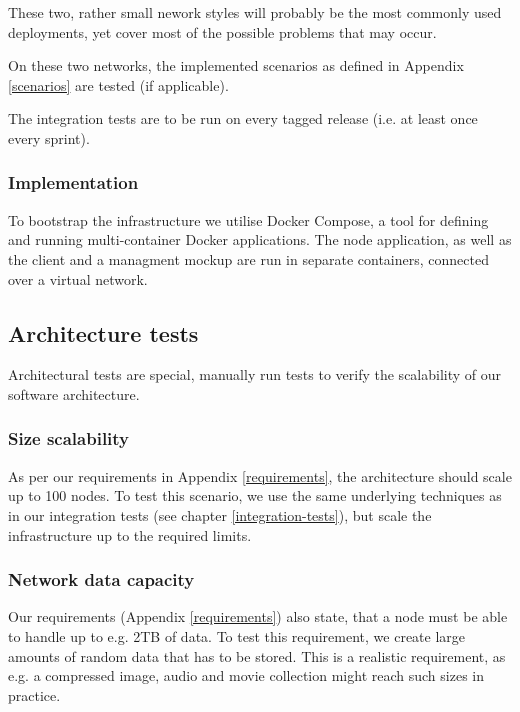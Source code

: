 These two, rather small nework styles will probably be the most commonly used deployments, yet cover most of the possible problems that may occur.

On these two networks, the implemented scenarios as defined in Appendix \ref{scenarios} are tested (if applicable).

The integration tests are to be run on every tagged release (i.e. at least once every sprint).

\subsubsection{Implementation}

To bootstrap the infrastructure we utilise Docker Compose, a tool for defining and running multi-container Docker applications\cite{docker-compose}. The node application, as well as the client and a managment mockup are run in separate containers, connected over a virtual network.

\subsection{Architecture tests}

Architectural tests are special, manually run tests to verify the scalability of our software architecture.

\subsubsection{Size scalability}
As per our requirements in Appendix \ref{requirements}, the architecture should scale up to 100 nodes. To test this scenario, we use the same underlying techniques as in our integration tests (see chapter \ref{integration-tests}), but scale the infrastructure up to the required limits.

\subsubsection{Network data capacity}
Our requirements (Appendix \ref{requirements}) also state, that a node must be able to handle up to e.g. 2TB of data. To test this requirement, we create large amounts of random data that has to be stored. This is a realistic requirement, as e.g. a compressed image, audio and movie collection might reach such sizes in practice.
